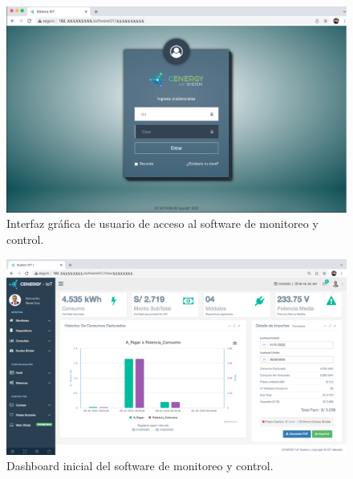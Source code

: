 \begin{landscape} %
\begin{figure}[htpb]
\centering 
\includegraphics[width=1.55\textwidth]{./Figures/gui/0.png}
\caption{Interfaz gráfica de usuario de acceso al software de monitoreo y control.}
\label{fig:gui0}
\end{figure}
\end{landscape} %


\begin{landscape} %
\begin{figure}[htpb]
\centering 
\includegraphics[width=1.55\textwidth]{./Figures/gui/1.png}
\caption{Dashboard inicial del software de monitoreo y control.}
\label{fig:gui1}
\end{figure}
\end{landscape} %

